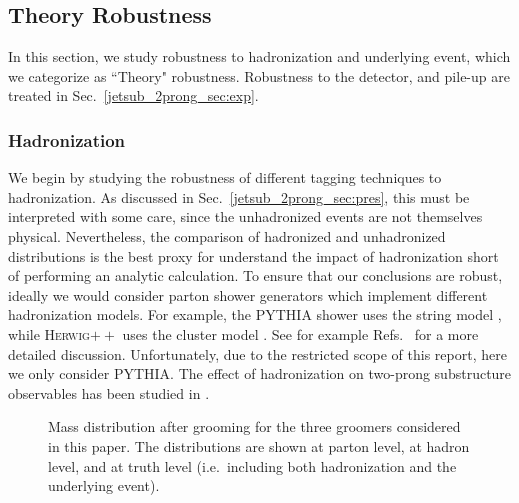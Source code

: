 \documentclass[11pt]{cernrep}
\begin{document}
\subsection{Theory Robustness}\label{jetsub_2prong_sec:np}


In this section, we study robustness to hadronization and underlying event, which we categorize as ``Theory" robustness. Robustness to the detector, and pile-up are treated in Sec.~\ref{jetsub_2prong_sec:exp}. 


\subsubsection{Hadronization}\label{jetsub_2prong_sec:hadr}

We begin by studying the robustness of different tagging techniques to hadronization.
%
As discussed in Sec.~\ref{jetsub_2prong_sec:pres}, this must be interpreted with some care, since the unhadronized events are not themselves physical.
%
Nevertheless, the comparison of hadronized and unhadronized distributions is the best proxy for understand the impact of hadronization short of performing an analytic calculation.
%
To ensure that our conclusions are robust, ideally we would consider parton shower generators which implement different hadronization models.
%
For example, the \textsc{PYTHIA} shower uses the string model \cite{Andersson:1983ia,Andersson:1998tv}, while \textsc{Herwig}$++$ uses the cluster model \cite{Webber:1983if,Marchesini:1987cf}.
%
See for example Refs.~\cite{Buckley:2011ms,Skands:2011pf,Skands:2012ts} for a more detailed discussion.
%
Unfortunately, due to the restricted scope of this report, here we only consider \textsc{PYTHIA}.
%
The effect of hadronization on two-prong substructure observables has been studied in \cite{Larkoski:2015kga,Salam:2016yht,Larkoski:2017iuy,Larkoski:2017cqq}.

\begin{figure}
  \caption{Mass distribution after grooming for the three groomers
    considered in this paper. The distributions are shown at parton
    level, at hadron level, and at truth level (i.e.\ including both
    hadronization and the underlying event).}\label{jetsub_2prong_fig:mass-distribution}
\end{figure}
\end{document}
